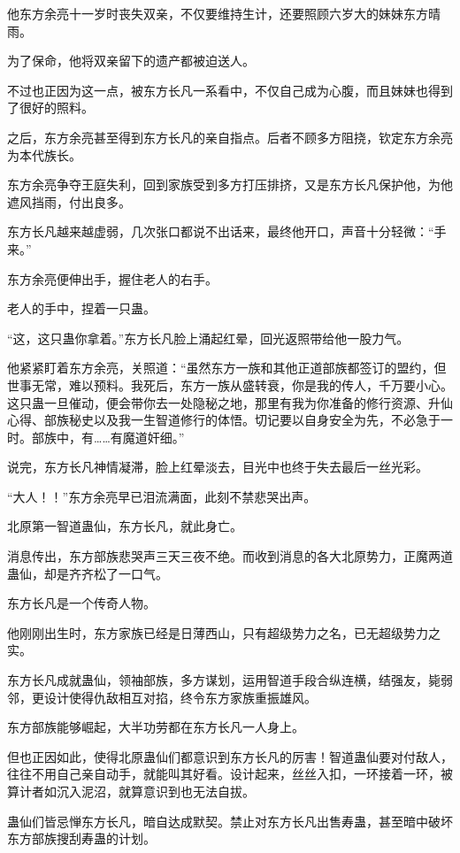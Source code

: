 \begin{this_body}
他东方余亮十一岁时丧失双亲，不仅要维持生计，还要照顾六岁大的妹妹东方晴雨。

为了保命，他将双亲留下的遗产都被迫送人。

不过也正因为这一点，被东方长凡一系看中，不仅自己成为心腹，而且妹妹也得到了很好的照料。

之后，东方余亮甚至得到东方长凡的亲自指点。后者不顾多方阻挠，钦定东方余亮为本代族长。

东方余亮争夺王庭失利，回到家族受到多方打压排挤，又是东方长凡保护他，为他遮风挡雨，付出良多。

东方长凡越来越虚弱，几次张口都说不出话来，最终他开口，声音十分轻微：“手来。”

东方余亮便伸出手，握住老人的右手。

老人的手中，捏着一只蛊。

“这，这只蛊你拿着。”东方长凡脸上涌起红晕，回光返照带给他一股力气。

他紧紧盯着东方余亮，关照道：“虽然东方一族和其他正道部族都签订的盟约，但世事无常，难以预料。我死后，东方一族从盛转衰，你是我的传人，千万要小心。这只蛊一旦催动，便会带你去一处隐秘之地，那里有我为你准备的修行资源、升仙心得、部族秘史以及我一生智道修行的体悟。切记要以自身安全为先，不必急于一时。部族中，有……有魔道奸细。”

说完，东方长凡神情凝滞，脸上红晕淡去，目光中也终于失去最后一丝光彩。

“大人！！”东方余亮早已泪流满面，此刻不禁悲哭出声。

北原第一智道蛊仙，东方长凡，就此身亡。

消息传出，东方部族悲哭声三天三夜不绝。而收到消息的各大北原势力，正魔两道蛊仙，却是齐齐松了一口气。

东方长凡是一个传奇人物。

他刚刚出生时，东方家族已经是日薄西山，只有超级势力之名，已无超级势力之实。

东方长凡成就蛊仙，领袖部族，多方谋划，运用智道手段合纵连横，结强友，毙弱邻，更设计使得仇敌相互对掐，终令东方家族重振雄风。

东方部族能够崛起，大半功劳都在东方长凡一人身上。

但也正因如此，使得北原蛊仙们都意识到东方长凡的厉害！智道蛊仙要对付敌人，往往不用自己亲自动手，就能叫其好看。设计起来，丝丝入扣，一环接着一环，被算计者如沉入泥沼，就算意识到也无法自拔。

蛊仙们皆忌惮东方长凡，暗自达成默契。禁止对东方长凡出售寿蛊，甚至暗中破坏东方部族搜刮寿蛊的计划。


\end{this_body}
